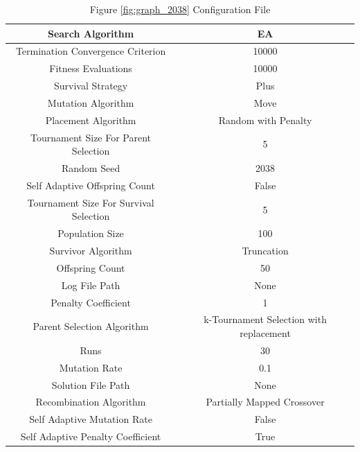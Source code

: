 \documentclass{standalone}
\begin{document}
\begin{table}[!htb]
	\centering
	\caption{Figure \ref{fig:graph_2038} Configuration File}
	\label{tab:graph_2038}
	\begin{tabular}{| c | c |}
		\hline
		Search Algorithm		& EA		 \\
		\hline
		Termination Convergence Criterion		& 10000		 \\
		\hline
		Fitness Evaluations		& 10000		 \\
		\hline
		Survival Strategy		& Plus		 \\
		\hline
		Mutation Algorithm		& Move		 \\
		\hline
		Placement Algorithm		& Random with Penalty		 \\
		\hline
		Tournament Size For Parent Selection		& 5		 \\
		\hline
		Random Seed		& 2038		 \\
		\hline
		Self Adaptive Offspring Count		& False		 \\
		\hline
		Tournament Size For Survival Selection		& 5		 \\
		\hline
		Population Size		& 100		 \\
		\hline
		Survivor Algorithm		& Truncation		 \\
		\hline
		Offspring Count		& 50		 \\
		\hline
		Log File Path		& None		 \\
		\hline
		Penalty Coefficient		& 1		 \\
		\hline
		Parent Selection Algorithm		& k-Tournament Selection with replacement		 \\
		\hline
		Runs		& 30		 \\
		\hline
		Mutation Rate		& 0.1		 \\
		\hline
		Solution File Path		& None		 \\
		\hline
		Recombination Algorithm		& Partially Mapped Crossover		 \\
		\hline
		Self Adaptive Mutation Rate		& False		 \\
		\hline
		Self Adaptive Penalty Coefficient		& True		 \\
		\hline
	\end{tabular}
\end{table}
\end{document}
